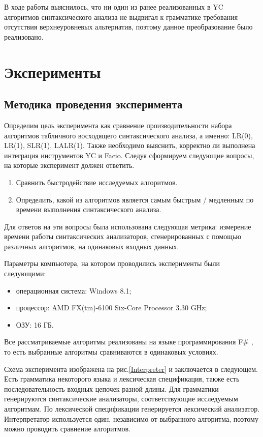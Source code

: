 \documentclass[14pt]{matmex-diploma}
\begin{document}
В ходе работы выяснилось, что ни один из ранее реализованных в YC алгоритмов синтаксического анализа не выдвигал к грамматике требования отсутствия верхнеуровневых альтернатив, поэтому данное преобразование было реализовано.

\section{Эксперименты}
\subsection{Методика проведения эксперимента}
Определим цель эксперимента как сравнение производительности набора алгоритмов табличного восходящего синтаксического анализа, а именно: LR(0), LR(1), SLR(1), LALR(1). Также необходимо выяснить, корректно ли выполнена интеграция инструментов YC и Facio. Следуя \cite{qma} сформируем следующие вопросы, на которые эксперимент должен ответить.
\begin{enumerate}
\item
Сравнить быстродействие исследуемых алгоритмов.
\item
Определить, какой из алгоритмов является самым быстрым / медленным по времени выполнения синтаксического анализа.
\end{enumerate}

Для ответов на эти вопросы была использована следующая метрика: измерение времени работы синтаксических анализаторов, сгенерированных с помощью различных алгоритмов, на одинаковых входных данных.

Параметры компьютера, на котором проводились эксперименты были следующими:
\begin{itemize}
\item
операционная система: Windows 8.1;
\item
процессор: AMD FX(tm)-6100 Six-Core Processor 3.30 GHz;
\item
ОЗУ: 16 ГБ.
\end{itemize}

Все рассматриваемые алгоритмы реализованы на языке программирования F\# \cite{link:fSharp}, то есть выбранные алгоритмы сравниваются в одинаковых условиях.

Схема эксперимента изображена на рис.\ref{Interpreter} и заключается в следующем. Есть грамматика некоторого языка и лексическая спецификация, также есть последовательность входных цепочек разной длины. Для грамматики генерируются синтаксические анализаторы, соответствующие исследуемым алгоритмам. По лексической спецификации генерируется лексический анализатор. Интерпретатор используется один, независимо от выбранного алгоритма, поэтому можно проводить сравнение алгоритмов.
\end{document}
